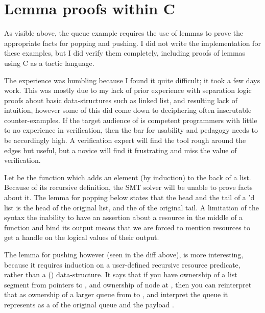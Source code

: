 \section{Lemma proofs within C}\label{sec:lemma-proof-c}

As visible above, the queue example requires the use of lemmas to prove the
appropriate facts for popping and pushing. I did not write the implementation
for these examples, but I did verify them completely, including proofs of
lemmas using C as a tactic language.

The experience was humbling because I found it quite difficult; it took a few
days work. This was mostly due to my lack of prior experience with separation
logic proofs about basic data-structures such as linked list, and resulting
lack of intuition, however some of this did come down to deciphering often
inscrutable counter-examples. If the target audience of  is competent
programmers with little to no experience in verification, then the bar for
usability and pedagogy needs to be accordingly high. A verification expert
will find the tool rough around the edges but useful, but a novice will find
it frustrating and miss the value of verification.

Let  be the function which adds an element (by induction) to the
back of a list. Because of its recursive definition, the SMT solver will be
unable to prove facts about it. The lemma for popping below states that the head
and the tail of a 'd list is the head of the
original list, and the  of the original tail. A limitation of the
syntax \textemdash{} the inability to have an assertion about a resource in the
middle of a function and bind its output \textemdash{} means that we are
forced to mention resources to get a handle on the logical values of their
output.


The lemma for pushing however (seen in the diff above), is more interesting,
because it requires induction on a user-defined recursive resource predicate,
rather than a  () data-structure. It says that if you
have ownership of a list segment from pointers  to ,
and ownership of node  at , then you can
reinterpret that as ownership of a larger queue from  to
, and interpret the  queue it represents as a
 of the original queue and the payload .

